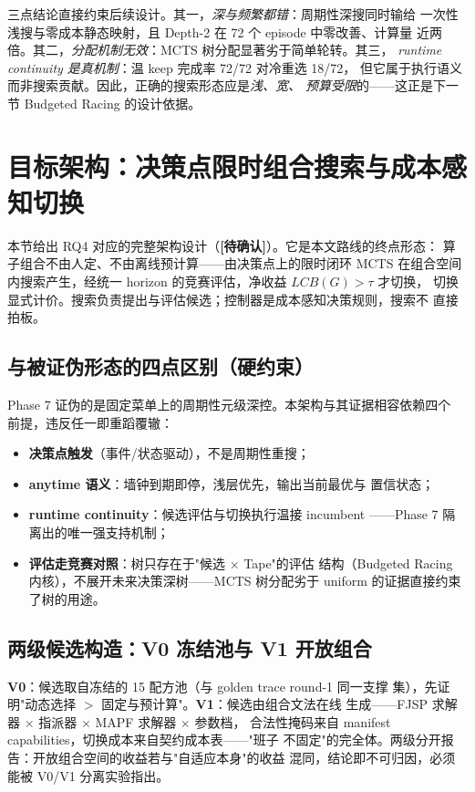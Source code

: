 \documentclass[11pt,a4paper]{article}
\newcommand{\racing}{Budgeted Racing}
\newcommand{\pending}{\textcolor{red!70!black}{\textbf{[待确认]}}}
\begin{document}
三点结论直接约束后续设计。其一，\emph{深与频繁都错}：周期性深搜同时输给
一次性浅搜与零成本静态映射，且 Depth-2 在 72 个 episode 中零改善、计算量
近两倍。其二，\emph{分配机制无效}：MCTS 树分配显著劣于简单轮转。其三，
\emph{runtime continuity 是真机制}：温 keep 完成率 72/72 对冷重选 18/72，
但它属于执行语义而非搜索贡献。因此，正确的搜索形态应是\emph{浅、宽、
预算受限}的——这正是下一节 \racing{} 的设计依据。

\section{目标架构：决策点限时组合搜索与成本感知切换}
\label{sec:target}

本节给出 RQ4 对应的完整架构设计（\pending）。它是本文路线的终点形态：
算子组合不由人定、不由离线预计算——由决策点上的限时闭环 MCTS 在组合空间
内搜索产生，经统一 horizon 的竞赛评估，净收益 $LCB(G) > \tau$ 才切换，
切换显式计价。搜索负责提出与评估候选；控制器是成本感知决策规则，搜索不
直接拍板。

\subsection{与被证伪形态的四点区别（硬约束）}

Phase 7 证伪的是固定菜单上的周期性元级深控。本架构与其证据相容依赖四个
前提，违反任一即重蹈覆辙：
\begin{itemize}
    \item \textbf{决策点触发}（事件/状态驱动），不是周期性重搜；
    \item \textbf{anytime 语义}：墙钟到期即停，浅层优先，输出当前最优与
    置信状态；
    \item \textbf{runtime continuity}：候选评估与切换执行温接 incumbent
    ——Phase 7 隔离出的唯一强支持机制；
    \item \textbf{评估走竞赛对照}：树只存在于"候选 $\times$ Tape"的评估
    结构（\racing{} 内核），不展开未来决策深树——MCTS 树分配劣于 uniform
    的证据直接约束了树的用途。
\end{itemize}

\subsection{两级候选构造：V0 冻结池与 V1 开放组合}

\textbf{V0}：候选取自冻结的 15 配方池（与 golden trace round-1 同一支撑
集），先证明"动态选择 $>$ 固定与预计算"。\textbf{V1}：候选由组合文法在线
生成——FJSP 求解器 $\times$ 指派器 $\times$ MAPF 求解器 $\times$ 参数档，
合法性掩码来自 manifest capabilities，切换成本来自契约成本表——"班子
不固定"的完全体。两级分开报告：开放组合空间的收益若与"自适应本身"的收益
混同，结论即不可归因，必须能被 V0/V1 分离实验指出。
\end{document}
